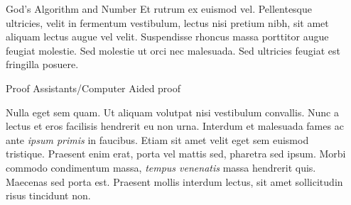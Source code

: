 \documentclass[final]{beamer}
\newlength{\sepwidth}
\newlength{\colwidth}
\newcommand{\separatorcolumn}{\begin{column}{\sepwidth}\end{column}}
\begin{document}
\begin{frame}[t]
\begin{columns}[t]
\begin{column}{\colwidth}
\begin{block}{God's Algorithm and Number}
    Et rutrum ex euismod vel. Pellentesque ultricies, velit in fermentum
    vestibulum, lectus nisi pretium nibh, sit amet aliquam lectus augue vel
    velit. Suspendisse rhoncus massa porttitor augue feugiat molestie. Sed
    molestie ut orci nec malesuada. Sed ultricies feugiat est fringilla
    posuere. \\
    \begin{center}
    \end{center}

  \end{block}

  \begin{block}{Proof Assistants/Computer Aided proof}

    \large Nulla eget sem quam. Ut aliquam volutpat nisi vestibulum convallis. Nunc a
    lectus et eros facilisis hendrerit eu non urna. Interdum et malesuada fames
    ac ante \textit{ipsum primis} in faucibus. Etiam sit amet velit eget sem
    euismod tristique. Praesent enim erat, porta vel mattis sed, pharetra sed
    ipsum. Morbi commodo condimentum massa, \textit{tempus venenatis} massa
    hendrerit quis. Maecenas sed porta est. Praesent mollis interdum lectus,
    sit amet sollicitudin risus tincidunt non.

  \end{block}

\end{column}

\separatorcolumn


\end{columns}
\end{frame}
\end{document}
